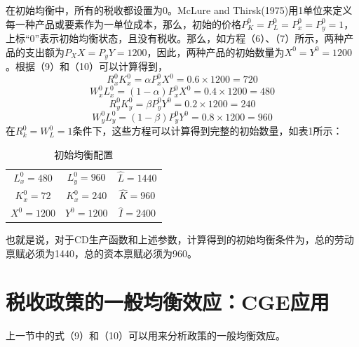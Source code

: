 \documentclass[cn,10pt,math=newtx,citestyle=gb7714-2015,bibstyle=gb7714-2015]{elegantbook}
\begin{document}
	在初始均衡中，所有的税收都设置为0。McLure and Thirsk(1975)用1单位来定义每一种产品或要素作为一单位成本，那么，初始的价格$P_K^0=P_L^0=P_x^0=P_y^0=1$，上标“0”表示初始均衡状态，且没有税收。那么，如方程（6）、（7）所示，两种产品的支出额为$P_XX=P_yY=1200$，因此，两种产品的初始数量为$X^0=Y^0=1200$。根据（9）和（10）可以计算得到，
	\begin{equation}
		R_x^0K_x^0=\alpha P_x^0X^0=0.6 \times 1200=720
	\end{equation}
	\begin{equation}
		W_x^0L_x^0=(1-\alpha) P_x^0X^0=0.4 \times 1200=480
	\end{equation}
	\begin{equation}
		R_y^0K_y^0=\beta P_y^0Y^0=0.2 \times 1200=240
	\end{equation}
	\begin{equation}
		W_y^0L_y^0=(1-\beta) P_y^0Y^0=0.8 \times 1200=960
	\end{equation}
	在$R_k^0=W_L^0=1$条件下，这些方程可以计算得到完整的初始数量，如表1所示：
	
	\begin{table}[!htbp]
		\centering
		\caption{初始均衡配置}
		\begin{tabular}{ccc}
			\hline
			$L^0_x=480$& $L^0_y=960$ & $\hat{L}=1440$ \\
			$K^0_x=72$& $K^0_x=240$ &$\hat{K}=960$  \\
			$X^0=1200$& $Y^0=1200$ & $\hat{I}=2400$ \\
			\hline
		\end{tabular}
	\end{table}
	
	也就是说，对于CD生产函数和上述参数，计算得到的初始均衡条件为，总的劳动禀赋必须为1440，总的资本禀赋必须为960。
	
	
	\section{税收政策的一般均衡效应：CGE应用}
	上一节中的式（9）和（10）可以用来分析政策的一般均衡效应。
\end{document}
